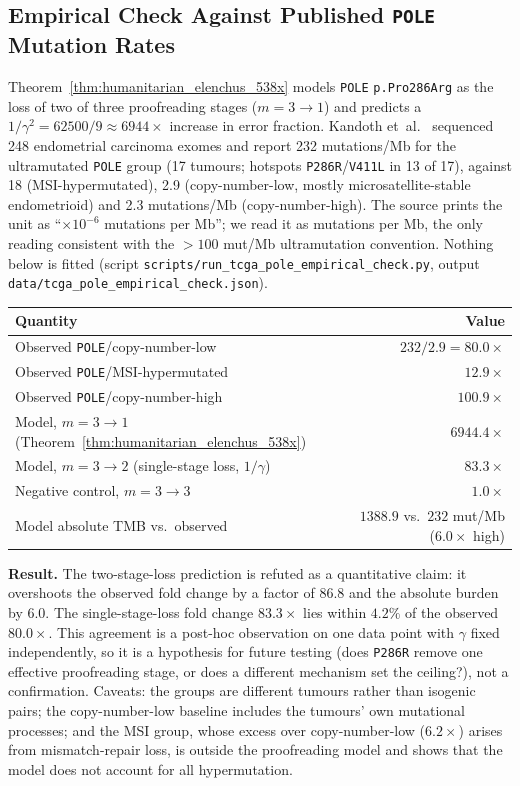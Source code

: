 \documentclass[11pt,a4paper]{article}
\theoremstyle{definition}
\begin{document}
\subsection{Empirical Check Against Published \texttt{POLE} Mutation Rates}
\label{sec:tcga_check}
Theorem~\ref{thm:humanitarian_elenchus_538x} models \texttt{POLE} \texttt{p.Pro286Arg} as the loss of two of three proofreading stages ($m=3\to 1$) and predicts a $1/\gamma^2 = 62500/9 \approx 6944\times$ increase in error fraction. Kandoth et~al.~\cite{kandoth2013} sequenced 248 endometrial carcinoma exomes and report 232 mutations/Mb for the ultramutated \texttt{POLE} group (17 tumours; hotspots \texttt{P286R}/\texttt{V411L} in 13 of 17), against 18 (MSI-hypermutated), 2.9 (copy-number-low, mostly microsatellite-stable endometrioid) and 2.3 mutations/Mb (copy-number-high). The source prints the unit as ``$\times 10^{-6}$ mutations per Mb''; we read it as mutations per Mb, the only reading consistent with the $>100$ mut/Mb ultramutation convention. Nothing below is fitted (script \texttt{scripts/run\_tcga\_pole\_empirical\_check.py}, output \texttt{data/tcga\_pole\_empirical\_check.json}).
\begin{center}
\begin{tabular}{@{}lr@{}}
\toprule
Quantity & Value \\
\midrule
Observed \texttt{POLE}/copy-number-low & $232/2.9 = 80.0\times$ \\
Observed \texttt{POLE}/MSI-hypermutated & $12.9\times$ \\
Observed \texttt{POLE}/copy-number-high & $100.9\times$ \\
Model, $m=3\to 1$ (Theorem~\ref{thm:humanitarian_elenchus_538x}) & $6944.4\times$ \\
Model, $m=3\to 2$ (single-stage loss, $1/\gamma$) & $83.3\times$ \\
Negative control, $m=3\to 3$ & $1.0\times$ \\
Model absolute TMB vs.\ observed & $1388.9$ vs.\ $232$ mut/Mb ($6.0\times$ high) \\
\bottomrule
\end{tabular}
\end{center}
\textbf{Result.} The two-stage-loss prediction is refuted as a quantitative claim: it overshoots the observed fold change by a factor of $86.8$ and the absolute burden by $6.0$. The single-stage-loss fold change $83.3\times$ lies within $4.2\%$ of the observed $80.0\times$. This agreement is a post-hoc observation on one data point with $\gamma$ fixed independently, so it is a hypothesis for future testing (does \texttt{P286R} remove one effective proofreading stage, or does a different mechanism set the ceiling?), not a confirmation. Caveats: the groups are different tumours rather than isogenic pairs; the copy-number-low baseline includes the tumours' own mutational processes; and the MSI group, whose excess over copy-number-low ($6.2\times$) arises from mismatch-repair loss, is outside the proofreading model and shows that the model does not account for all hypermutation.
\end{document}
